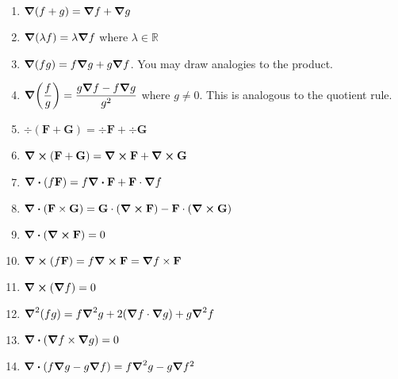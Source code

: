 \begin{enumerate}
    \item \(\grad(f + g) = \grad f + \grad g\)
    \item \(\grad (\lambda f) = \lambda \grad f\) where \(\lambda \in \mathbb{R}\)
    \item \(\grad (fg) =  f \grad g + g \grad f\). You may draw analogies to the product.
    \item \(\grad (\dfrac{f}{g}) = \dfrac{g\grad f - f\grad g}{g^2}\) where \(g\neq 0\). This is analogous to the quotient rule.
    \item \(\div (\textbf{F} + \textbf{G}) = \div \textbf{F} + \div \textbf{G}\)
    \item \(\curl (\textbf{F} + \textbf{G}) = \curl \textbf{F} + \curl \textbf{G}\)
    \item \(\div (f\textbf{F}) = f\div \textbf{F} + \textbf{F}\cdot \grad f\)
    \item \(\div (\textbf{F}\times \textbf{G}) = \textbf{G} \cdot (\curl \textbf{F}) - \textbf{F} \cdot (\curl \textbf{G})\)
    \item \(\div(\curl \textbf{F}) = 0\)
    \item \(\curl (f\textbf{F}) = f\curl \textbf{F} = \grad f \times \textbf{F}\)
    \item  \(\curl (\grad f) = 0\)
    \item \(\grad^2 (fg) = f\grad^2 g + 2(\grad f \cdot \grad g) + g\grad^2f\)
    \item \(\div (\grad f \times \grad g) = 0\)
    \item \(\div(f\grad g - g\grad f) = f\grad^2 g - g\grad f^2\)
\end{enumerate}